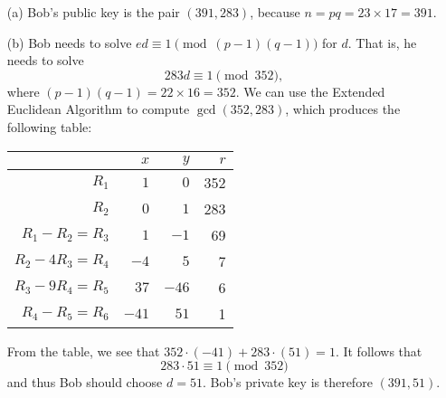 \documentclass[11pt]{article}
\theoremstyle{plain}
\theoremstyle{definition}
\begin{document}
\begin{enumerate}
\begin{Solution}
\begin{enumerate}
\item[(a)] Bob's public key is the pair $(391,283)$, because $n=pq = 23\times17 = 391$.
\item[(b)] Bob needs to solve $ed\equiv 1\pmod{(p-1)(q-1)}$ for $d$. That is, he needs to solve
\[
 283d\equiv 1\pmod{352},
\]
where $(p-1)(q-1)=22\times16=352$. We can use the Extended Euclidean Algorithm to compute $\gcd(352,283)$, which produces the following table:
\begin{center}
\begin{tabular}{|r|r|r|r|}
\hline
 & $x$ & $y$ & $r$\\\hline
 $R_1$             &   $1$ &   $0$ & 352\\
 $R_2$             &   $0$ &   $1$ & 283\\
 $R_1 - R_2 = R_3$ &   $1$ &  $-1$ &  69\\
 $R_2 -4R_3 = R_4$ &  $-4$ &   $5$ &   7\\
 $R_3 -9R_4 = R_5$ &  $37$ & $-46$ &   6\\
 $R_4 -R_5  = R_6$ & $-41$ &  $51$ &   1\\\hline
\end{tabular}
\end{center}
From the table, we see that $352\cdot(-41) + 283\cdot(51) = 1$. It follows that 
\[
 283\cdot 51 \equiv 1 \pmod{352}
\]
and thus Bob should choose $d=51$. Bob's private key is therefore $(391,51)$.


\end{enumerate}
\end{Solution}
\end{enumerate}
\end{document}
